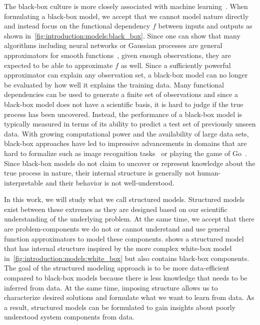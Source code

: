 The black-box culture is more closely associated with machine learning~\parencite{mitchell_machine_1997,goodfellow_deep_2016}.
When formulating a black-box model, we accept that we cannot model nature directly and instead focus on the functional dependency $f$ between inputs and outputs as shown in~\cref{fig:introduction:models:black_box}.
Since one can show that many algorithms including neural networks or Gaussian processes are general approximators for smooth functions~\parencite{rasmussen_gaussian_2006}, given enough observations, they are expected to be able to approximate $f$ as well.
Since a sufficiently powerful approximator can explain any observation set, a black-box model can no longer be evaluated by how well it explains the training data.
Many functional dependencies can be used to generate a finite set of observations and since a black-box model does not have a scientific basis, it is hard to judge if the true process has been uncovered.
Instead, the performance of a black-box model is typically measured in terms of its ability to predict a test set of previously unseen data.
With growing computational power and the availability of large data sets, black-box approaches have led to impressive advancements in domains that are hard to formalize such as image recognition tasks~\parencite{lecun_backpropagation_1989} or playing the game of Go~\parencite{silver_mastering_2016}.
Since black-box models do not claim to uncover or represent knowledge about the true process in nature, their internal structure is generally not human-interpretable and their behavior is not well-understood.

In this work, we will study what we call structured models.
Structured models exist between these extremes as they are designed based on our scientific understanding of the underlying problem.
At the same time, we accept that there are problem-components we do not or cannot understand and use general function approximators to model these components.
 shows a structured model that has internal structure inspired by the more complex white-box model in~\cref{fig:introduction:models:white_box} but also contains black-box components.
The goal of the structured modeling approach is to be more data-efficient compared to black-box models because there is less knowledge that needs to be inferred from data.
At the same time, imposing structure allows us to characterize desired solutions and formulate what we want to learn from data.
As a result, structured models can be formulated to gain insights about poorly understood system components from data.

